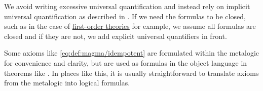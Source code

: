 \begin{remark}
\begin{thmenum}
     We avoid writing excessive universal quantification and instead rely on implicit universal quantification as described in . If we need the formulas to be closed, such as in the case of \hyperref[def:first_order_theory]{first-order theories} for example, we assume all formulas are closed and if they are not, we add explicit universal quantifiers in front.
  \end{thmenum}

  Some axioms like \eqref{eq:def:magma/idempotent} are formulated within the metalogic for convenience and clarity, but are used as formulas in the object language in theorems like . In places like this, it is usually straightforward to translate axioms from the metalogic into logical formulas.
\end{remark}

